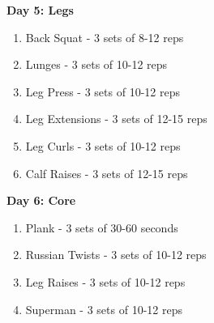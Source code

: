 \documentclass{article}
\begin{document}
\vspace{\baselineskip}

\noindent
\textbf{Day 5: Legs}
\begin{enumerate}
    \item Back Squat - 3 sets of 8-12 reps
    \item Lunges - 3 sets of 10-12 reps
    \item Leg Press - 3 sets of 10-12 reps
    \item Leg Extensions - 3 sets of 12-15 reps
    \item Leg Curls - 3 sets of 10-12 reps
    \item Calf Raises - 3 sets of 12-15 reps
\end{enumerate}

\vspace{\baselineskip}

\noindent
\textbf{Day 6: Core}
\begin{enumerate}
    \item Plank - 3 sets of 30-60 seconds
    \item Russian Twists - 3 sets of 10-12 reps
    \item Leg Raises - 3 sets of 10-12 reps
    \item Superman - 3 sets of 10-12 reps
\end{enumerate}
\end{document}
